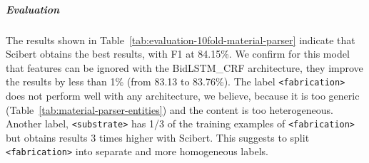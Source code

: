 \documentclass[]{interact}
\theoremstyle{plain}%
\theoremstyle{definition}
\theoremstyle{remark}
\begin{document}
\subparagraph*{Evaluation}

The results shown in Table~\ref{tab:evaluation-10fold-material-parser} indicate that Scibert obtains the best results, with F1 at 84.15\%.
We confirm for this model that features can be ignored with the BidLSTM\_CRF architecture, they improve the results by less than 1\% (from 83.13 to 83.76\%). 
The label \texttt{<fabrication>} does not perform well with any architecture, we believe, because it is too generic (Table~\ref{tab:material-parser-entities}) and the content is too heterogeneous. Another label, \texttt{<substrate>} has 1/3 of the training examples of \texttt{<fabrication>} but obtains results 3 times higher with Scibert. 
This suggests to split \texttt{<fabrication>} into separate and more homogeneous labels. 

\begin{table}[ht]
\centering\small
{}
\end{table}
\end{document}
